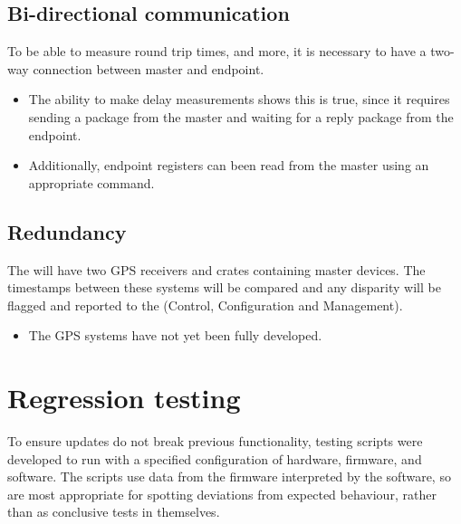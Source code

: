 \documentclass{dune}
\begin{document}

\subsection{Bi-directional communication}
To be able to measure round trip times, and more, it is necessary to have a two-way connection between master and endpoint.
\begin{itemize}
  \item The ability to make delay measurements shows this is true, since it requires sending a package from the master and waiting for a reply package from the endpoint.
  \item Additionally, endpoint registers can been read from the master using an appropriate command.
\end{itemize}

\subsection{Redundancy}
The  will have two GPS receivers and crates containing master devices.
The timestamps between these systems will be compared and any disparity will be flagged and reported to the  (Control, Configuration and Management).
\begin{itemize}
  \item The GPS systems have not yet been fully developed.
\end{itemize}


\section{Regression testing}
\label{sec:test-scripts}
To ensure updates do not break previous functionality, testing scripts were developed to run with a specified configuration of hardware, firmware, and software.
The scripts use data from the firmware interpreted by the software, so are most appropriate for spotting deviations from expected behaviour, rather than as conclusive tests in themselves.
\end{document}
